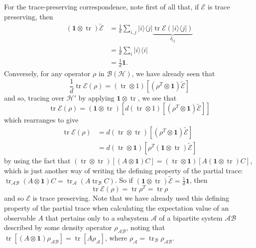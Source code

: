 \documentclass[fleqn,a4paper]{article}
\theoremstyle{definition}
\theoremstyle{definition}
\theoremstyle{definition}
\theoremstyle{definition}
\theoremstyle{remark}
\begin{document}
For the trace-preserving correspondence, note first of all that, if \(\mathcal{E}\) is trace preserving, then
\[
  \begin{aligned}
    (\mathbf{1}\otimes\operatorname{tr})\widetilde{\mathcal{E}}
    &= \frac{1}{d}\sum_{i,j} |i\rangle\langle j| \underbrace{\operatorname{tr}\mathcal{E}(|i\rangle\langle j|)}_{\delta_{ij}}
  \\&= \frac{1}{d}\sum_i|i\rangle\langle i|
  \\&= \frac{1}{d}\mathbf{1}.
  \end{aligned}
\]
Conversely, for any operator \(\rho\) in \(\mathcal{B}(\mathcal{H})\), we have already seen that
\[
  \frac{1}{d}\operatorname{tr}\mathcal{E}(\rho)
  = (\operatorname{tr}\otimes1)\left[(\rho^T\otimes\mathbf{1})\widetilde{\mathcal{E}}\right]
\]
and so, tracing over \(\mathcal{H}'\) by applying \(\mathbf{1}\otimes\operatorname{tr}\), we see that
\[
  \operatorname{tr}\mathcal{E}(\rho)
  = (\mathbf{1}\otimes\operatorname{tr})\left[d(\operatorname{tr}\otimes1)\left[(\rho^T\otimes\mathbf{1})\widetilde{\mathcal{E}}\right]\right]
\]
which rearranges to give
\[
  \begin{aligned}
    \operatorname{tr}\mathcal{E}(\rho)
    &= d(\operatorname{tr}\otimes\operatorname{tr})\left[(\rho^T\otimes\mathbf{1})\widetilde{\mathcal{E}}\right]
  \\&= d(\operatorname{tr}\otimes\mathbf{1})\left[\rho^T(\mathbf{1}\otimes\operatorname{tr})\widetilde{\mathcal{E}}\right]
  \end{aligned}
\]
by using the fact that \((\operatorname{tr}\otimes\operatorname{tr})[(A\otimes\mathbf{1})C]=(\operatorname{tr}\otimes\mathbf{1})[A(\mathbf{1}\otimes\operatorname{tr})C]\), which is just another way of writing the defining property of the partial trace: \(\operatorname{tr}_{\mathcal{AB}}(A\otimes\mathbf{1})C=\operatorname{tr}_{\mathcal{A}}(A\operatorname{tr}_{\mathcal{B}}C)\).
So if \((\mathbf{1}\otimes\operatorname{tr})\widetilde{\mathcal{E}}=\frac{1}{d}\mathbf{1}\), then
\[
  \operatorname{tr}\mathcal{E}(\rho)
  = \operatorname{tr}\rho^T
  = \operatorname{tr}\rho
\]
and so \(\mathcal{E}\) is trace preserving.
Note that we have already used this defining property of the partial trace when calculating the expectation value of an observable \(A\) that pertains only to a subsystem \(\mathcal{A}\) of a bipartite system \(\mathcal{AB}\) described by some density operator \(\rho_{\mathcal{AB}}\), noting that \(\operatorname{tr}[(A\otimes\mathbf{1})\rho_{\mathcal{AB}}]=\operatorname{tr}[A\rho_{\mathcal{A}}]\), where \(\rho_{\mathcal{A}}=\operatorname{tr}_\mathcal{B}\rho_{\mathcal{AB}}\).
\end{document}
